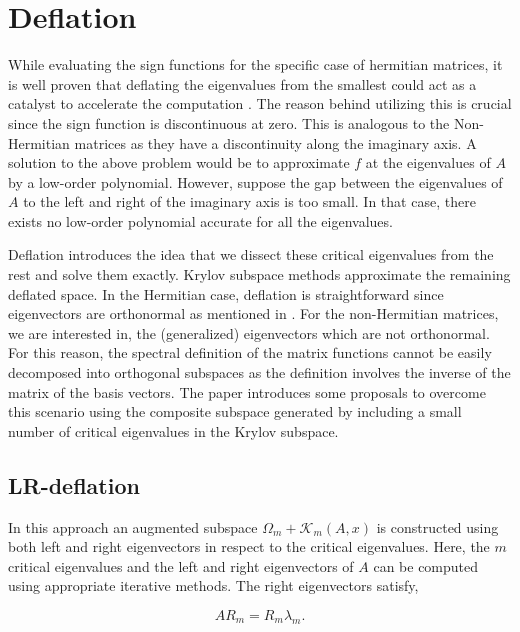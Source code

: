 \chapter{Deflation}
\label{sec:deflation}

While evaluating the sign functions for the specific case of hermitian matrices, it is well proven that deflating the eigenvalues from the smallest could act as a catalyst to accelerate the computation \cite{10}. The reason behind utilizing this is crucial since the sign function is discontinuous at zero. This is analogous to the Non-Hermitian matrices as they have a discontinuity along the imaginary axis. A solution to the above problem would be to approximate $f$ at the eigenvalues of $A$ by a low-order polynomial. However, suppose the gap between the eigenvalues of $A$ to the left and right of the imaginary axis is too small. In that case, there exists no low-order polynomial accurate for all the eigenvalues.

Deflation introduces the idea that we dissect these critical eigenvalues from the rest and solve them exactly. Krylov subspace methods approximate the remaining deflated space. In the Hermitian case, deflation is straightforward since eigenvectors are orthonormal as mentioned in \cite{11}. For the non-Hermitian matrices, we are interested in, the (generalized) eigenvectors which are not orthonormal. For this reason, the spectral definition of the matrix functions cannot be easily decomposed into orthogonal subspaces as the definition involves the inverse of the matrix of the basis vectors. The paper \cite{11} introduces some proposals to overcome this scenario using the composite subspace generated by including a small number of critical eigenvalues in the Krylov subspace.

\section{LR-deflation}
\label{sec:LR_def}

In this approach an augmented subspace $\Omega_{m} + \mathcal{K}_{m}(A, x)$ is constructed using both left and right eigenvectors in respect to the critical eigenvalues. Here, the $m$ critical eigenvalues and the left and right eigenvectors of $A$ can be computed using appropriate iterative methods. The right eigenvectors satisfy,

\begin{equation}
    AR_{m} = R_{m}\lambda_{m}.
    \label{eq:2.57}
\end{equation}

